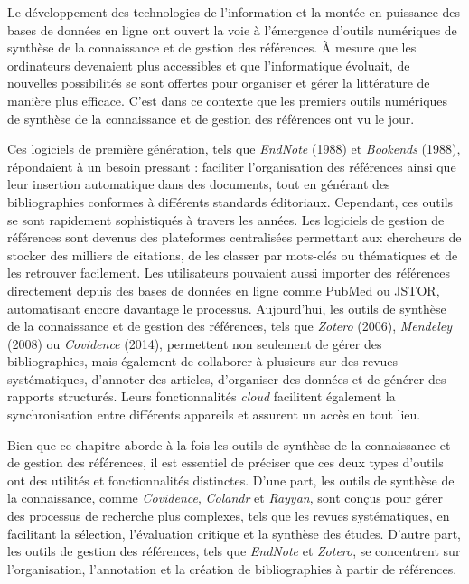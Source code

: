 \documentclass[
  letterpaper,
  DIV=11,
  numbers=noendperiod,
  oneside]{scrreprt}
\begin{document}
Le développement des technologies de l'information et la montée en
puissance des bases de données en ligne ont ouvert la voie à l'émergence
d'outils numériques de synthèse de la connaissance et de gestion des
références. À mesure que les ordinateurs devenaient plus accessibles et
que l'informatique évoluait, de nouvelles possibilités se sont offertes
pour organiser et gérer la littérature de manière plus efficace. C'est
dans ce contexte que les premiers outils numériques de synthèse de la
connaissance et de gestion des références ont vu le jour.

Ces logiciels de première génération, tels que \emph{EndNote} (1988) et
\emph{Bookends} (1988), répondaient à un besoin pressant : faciliter
l'organisation des références ainsi que leur insertion automatique dans
des documents, tout en générant des bibliographies conformes à
différents standards éditoriaux. Cependant, ces outils se sont
rapidement sophistiqués à travers les années. Les logiciels de gestion
de références sont devenus des plateformes centralisées permettant aux
chercheurs de stocker des milliers de citations, de les classer par
mots-clés ou thématiques et de les retrouver facilement. Les
utilisateurs pouvaient aussi importer des références directement depuis
des bases de données en ligne comme PubMed ou JSTOR, automatisant encore
davantage le processus. Aujourd'hui, les outils de synthèse de la
connaissance et de gestion des références, tels que \emph{Zotero}
(2006), \emph{Mendeley} (2008) ou \emph{Covidence} (2014), permettent
non seulement de gérer des bibliographies, mais également de collaborer
à plusieurs sur des revues systématiques, d'annoter des articles,
d'organiser des données et de générer des rapports structurés. Leurs
fonctionnalités \emph{cloud} facilitent également la synchronisation
entre différents appareils et assurent un accès en tout lieu.

Bien que ce chapitre aborde à la fois les outils de synthèse de la
connaissance et de gestion des références, il est essentiel de préciser
que ces deux types d'outils ont des utilités et fonctionnalités
distinctes. D'une part, les outils de synthèse de la connaissance, comme
\emph{Covidence}, \emph{Colandr} et \emph{Rayyan}, sont conçus pour
gérer des processus de recherche plus complexes, tels que les revues
systématiques, en facilitant la sélection, l'évaluation critique et la
synthèse des études. D'autre part, les outils de gestion des références,
tels que \emph{EndNote} et \emph{Zotero}, se concentrent sur
l'organisation, l'annotation et la création de bibliographies à partir
de références.
\end{document}
